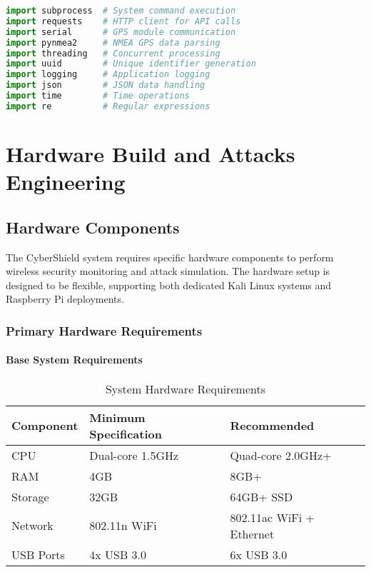 \documentclass[12pt,a4paper]{report}
\begin{document}
\begin{lstlisting}[language=Python, caption=Security Library Imports]
import subprocess  # System command execution
import requests    # HTTP client for API calls
import serial      # GPS module communication
import pynmea2     # NMEA GPS data parsing
import threading   # Concurrent processing
import uuid        # Unique identifier generation
import logging     # Application logging
import json        # JSON data handling
import time        # Time operations
import re          # Regular expressions
\end{lstlisting}

\chapter{Hardware Build and Attacks Engineering}

\section{Hardware Components}

The CyberShield system requires specific hardware components to perform wireless security monitoring and attack simulation. The hardware setup is designed to be flexible, supporting both dedicated Kali Linux systems and Raspberry Pi deployments.

\subsection{Primary Hardware Requirements}

\subsubsection{Base System Requirements}
\begin{table}[H]
\centering
\begin{tabular}{|l|l|l|}
\hline
\textbf{Component} & \textbf{Minimum Specification} & \textbf{Recommended} \\
\hline
CPU & Dual-core 1.5GHz & Quad-core 2.0GHz+ \\
\hline
RAM & 4GB & 8GB+ \\
\hline
Storage & 32GB & 64GB+ SSD \\
\hline
Network & 802.11n WiFi & 802.11ac WiFi + Ethernet \\
\hline
USB Ports & 4x USB 3.0 & 6x USB 3.0 \\
\hline
\end{tabular}
\caption{System Hardware Requirements}
\end{table}
\end{document}
